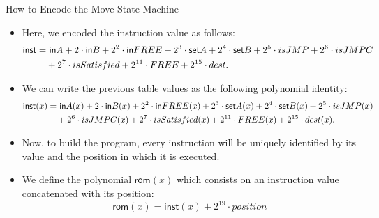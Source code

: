 \begin{frame}[allowframebreaks]{How to Encode the Move State Machine}
\normalsize
\begin{itemize}
\item Here, we encoded the instruction value as follows:
\begin{align*}
\mathsf{inst} = &~\mathsf{in} A + 2 \cdot \mathsf{in} B + 2^2 \cdot \mathsf{in} FREE + 2^3 \cdot \mathsf{set} A + 2^4 \cdot \mathsf{set} B + 2^5 \cdot isJMP + 2^6 \cdot isJMPC \\ 
& + 2^7 \cdot isSatisfied + 2^{11} \cdot FREE + 2^{15} \cdot dest.
\end{align*}

\item We can write the previous table values as the following polynomial identity:
\begin{align*}
\mathsf{inst}(x) = &~\mathsf{in} A(x) + 2 \cdot \mathsf{in} B(x) + 2^2 \cdot \mathsf{in} FREE(x) + 2^3 \cdot \mathsf{set} A(x) + 2^4 \cdot \mathsf{set} B(x) + 2^5 \cdot isJMP(x) \\
& + 2^6 \cdot isJMPC(x) + 2^7 \cdot isSatisfied(x) + 2^{11} \cdot FREE(x) + 2^{15} \cdot dest(x).
\end{align*}

\item Now, to build the program, every instruction will be uniquely identified by its value and the position in which it is executed.

\item We define the polynomial $\mathsf{rom}(x)$ which consists on an instruction value concatenated with its position:
\[
\mathsf{rom}(x) = \mathsf{inst}(x) + 2^{19} \cdot position
\]


\end{itemize}
\end{frame}
